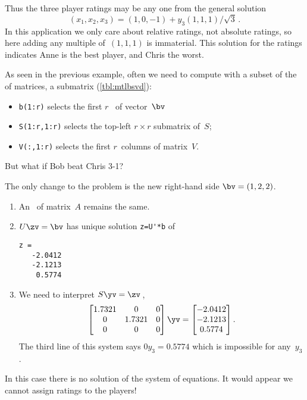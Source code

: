\begin{example}
\begin{solution}
Thus the three player ratings may be any one from the general solution
\begin{displaymath}
    (x_1,x_2,x_3) =(1,0,-1)
    +y_3(1,1,1)/\sqrt3\,.
\end{displaymath}
In this application we only care about relative ratings, not absolute ratings, so here adding any multiple of~\((1,1,1)\) is immaterial.
This solution for the ratings indicates Anne is the best player, and Chris the worst. 
\end{solution}
\end{example}


\begin{compute}
As seen in the previous example, often we need to compute with a subset of the  of matrices, a submatrix (\cref{tbl:mtlbsvd}):
\begin{itemize}
\item \verb|b(1:r)| selects the first \(r\)~ of vector~\(\bv\)
\item \verb|S(1:r,1:r)| selects the top-left \(r\times r\) submatrix of~\(S\);
\item \verb|V(:,1:r)| selects the first \(r\)~columns of matrix~\(V\).
\end{itemize}
\end{compute}



\begin{example} \label{eg:rstp2}
But what if Bob beat Chris 3-1?  
\begin{solution} 
The only change to the problem is the new right-hand side \(\bv=(1,2,2)\).
\begin{enumerate}
\item An \svd\ of matrix~\(A\) remains the same.
\item \(U\zv=\bv\) has unique solution \verb|z=U'*b| of
\begin{verbatim}
z =
   -2.0412
   -2.1213
    0.5774
\end{verbatim}
\item We need to interpret \(S\yv=\zv\)\,,
\begin{equation*}
\begin{bmatrix} 1.7321&0&0
\\0&1.7321&0
\\0&0&0 \end{bmatrix}\yv=\begin{bmatrix} 
   -2.0412\\-2.1213\\0.5774
\end{bmatrix}.
\end{equation*}
The third line of this system says \(0y_3=0.5774\) which is impossible for any~\(y_3\).
\end{enumerate}
In this case there is no solution of the system of equations.
It would appear we cannot assign ratings to the players!  
\end{solution}
\end{example}

